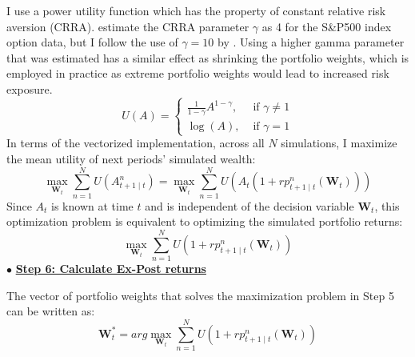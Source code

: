 I use a power utility function which has the property of constant relative risk aversion (CRRA). \cite{bliss2004option} estimate the CRRA parameter $\gamma$ as 4 for the S\&P500 index option data, but I follow the use of $\gamma = 10$ by \cite{faias2017optimal}. Using a higher gamma parameter that was estimated has a similar effect as shrinking the portfolio weights, which is employed in practice as extreme portfolio weights would lead to increased risk exposure.
\noindent
\[U(A)=\left\{\begin{array}{ll}\frac{1}{1-\gamma} A^{1-\gamma}, & \text { if } \gamma \neq 1 \\ \log (A), & \text { if } \gamma=1\end{array}\right.\]
\noindent
In terms of the vectorized implementation, across all $N$ simulations, I maximize the mean utility of next periods' simulated wealth:
\noindent
\[\max_{\mathbf{W}_{t}} \sum_{n = 1}^{N} U(A_{t+1 \mid t}^{n}) = \max_{\mathbf{W}_{t}} \sum_{n = 1}^{N} U(A_{t}(1 + rp_{t + 1 \mid t}^{n}(\mathbf{W}_{t})))\]
\noindent
Since $A_{t}$ is known at time $t$ and is independent of the decision variable $\mathbf{W}_{t}$, this optimization problem is equivalent to optimizing the simulated portfolio returns:
\noindent
\[\max_{\mathbf{W}_{t}} \sum_{n = 1}^{N} U(1 + rp_{t+1 \mid t}^{n}(\mathbf{W}_{t}))\]
\noindent
$\bullet$ \underline{\textbf{Step 6: Calculate Ex-Post returns}}

The vector of portfolio weights that solves the maximization problem in Step 5 can be written as:
\noindent
\[\mathbf{W}_{t}^{*} = arg \max_{\mathbf{W}_{t}} \sum_{n = 1}^{N} U(1 + rp_{t+1 \mid t}^{n}(\mathbf{W}_{t}))\]


